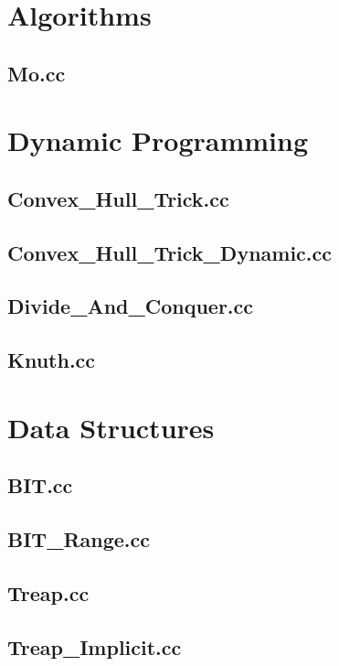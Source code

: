 \section{Algorithms}
\subsection{Mo.cc}

\section{Dynamic Programming}
\subsection{Convex\_Hull\_Trick.cc}

\subsection{Convex\_Hull\_Trick\_Dynamic.cc}

\subsection{Divide\_And\_Conquer.cc}

\subsection{Knuth.cc}

\section{Data Structures}
\subsection{BIT.cc}

\subsection{BIT\_Range.cc}

\subsection{Treap.cc}

\subsection{Treap\_Implicit.cc}

